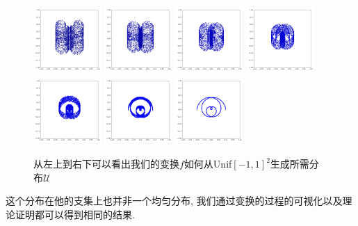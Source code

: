 \documentclass[lang=cn,11pt]{elegantpaper}
\begin{document}
\begin{figure}[hbt]
  \includegraphics[width=0.23\textwidth]{wings_1_6}
  \includegraphics[width=0.23\textwidth]{wings_1_7}
  \includegraphics[width=0.23\textwidth]{wings_1_8}
  \includegraphics[width=0.23\textwidth]{wings_1_9}
  \includegraphics[width=0.23\textwidth]{wings_1_10}
  \includegraphics[width=0.23\textwidth]{wings_1_11}
  \includegraphics[width=0.23\textwidth]{wings_1_12}

  
  \caption{从左上到右下可以看出我们的变换$f$如何从Unif$[-1,1]^2$生成所需分布$\mathcal U$}
\end{figure}

这个分布在他的支集上也并非一个均匀分布, 我们通过变换的过程的可视化以及理论证明都可以得到相同的结果.


\nocite{*}



\end{document}
